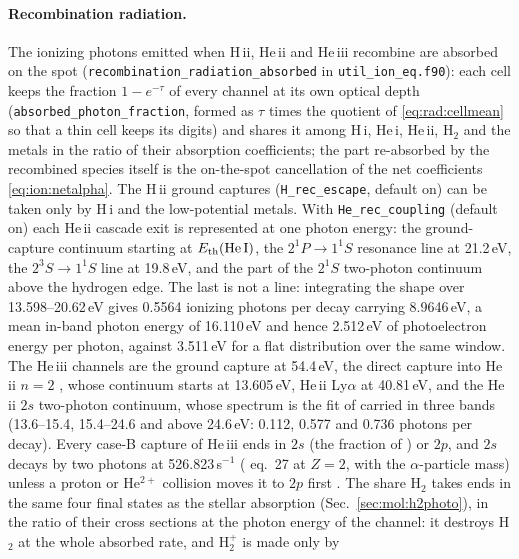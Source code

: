 \paragraph{Recombination radiation.} The ionizing photons emitted when
H\,{\sc ii}, He\,{\sc ii} and He\,{\sc iii} recombine are absorbed on the
spot (\texttt{recombination\_radiation\_absorbed} in
\texttt{util\_ion\_eq.f90}): each cell keeps the fraction $1-e^{-\tau}$ of
every channel at its own optical depth (\texttt{absorbed\_photon\_fraction},
formed as $\tau$ times the quotient of \eqref{eq:rad:cellmean} so that a thin
cell keeps its digits) and shares it among H\,{\sc i},
He\,{\sc i}, He\,{\sc ii}, H$_2$ and the metals in the ratio of their
absorption coefficients; the part re-absorbed by the recombined species
itself is the on-the-spot cancellation of the net coefficients
\eqref{eq:ion:netalpha}. The H\,{\sc ii} ground captures
(\texttt{H\_rec\_escape}, default on) can be taken only by H\,{\sc i} and
the low-potential metals. With \texttt{He\_rec\_coupling} (default on)
each He\,{\sc ii} cascade exit is represented at one photon energy: the
ground-capture continuum starting at $E_{\rm th}({\rm He\,I})$, the
$2^1P\to1^1S$ resonance line at 21.2\,eV, the $2^3S\to1^1S$ line at
19.8\,eV, and the part of the $2^1S$ two-photon continuum above the hydrogen
edge. The last is not a line: integrating the \citet{Drake1969} shape over
13.598--20.62\,eV gives 0.5564 ionizing photons per decay carrying
8.9646\,eV, a mean in-band photon energy of 16.110\,eV and hence 2.512\,eV of
photoelectron energy per photon, against 3.511\,eV for a flat distribution
over the same window. The He\,{\sc iii} channels are the ground capture at
54.4\,eV, the direct capture into He\,{\sc ii} $n=2$ \citep{Seaton1959},
whose continuum starts at 13.605\,eV, He\,{\sc ii} Ly$\alpha$ at 40.81\,eV,
and the He\,{\sc ii} $2s$ two-photon continuum, whose spectrum is the fit of
\citet{Nussbaumer1984} carried in three bands (13.6--15.4, 15.4--24.6 and
above 24.6\,eV: 0.112, 0.577 and 0.736 photons per decay). Every case-B
capture of He\,{\sc iii} ends in $2s$ (the fraction of
\citealt{Pengelly1964}) or $2p$, and $2s$ decays by two photons at
526.823\,s$^{-1}$ (\citealt{Drake1986} eq.~27 at $Z=2$, with the
$\alpha$-particle mass) unless a proton or He$^{2+}$ collision moves it to
$2p$ first \citep{Pengelly1964b}. The share H$_2$ takes ends in the same
four final states as the stellar absorption (Sec.~\ref{sec:mol:h2photo}),
in the ratio of their cross sections at the photon energy of the channel:
it destroys H$_2$ at the whole absorbed rate, and H$_2^+$ is made only by
